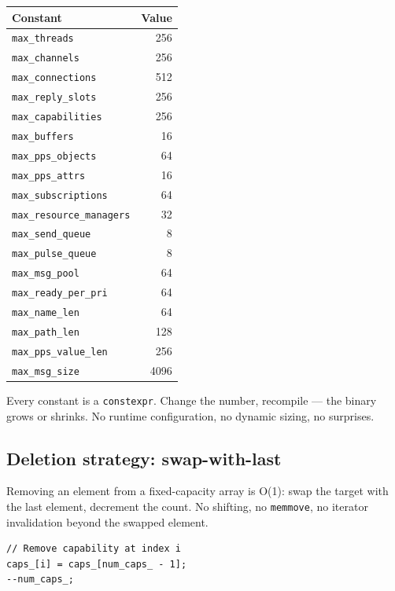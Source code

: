 \documentclass[11pt]{article}
\begin{document}
\begin{longtable}{lr}
\toprule
\textbf{Constant} & \textbf{Value} \\
\midrule
\texttt{max\_threads}          & 256 \\
\texttt{max\_channels}         & 256 \\
\texttt{max\_connections}      & 512 \\
\texttt{max\_reply\_slots}     & 256 \\
\texttt{max\_capabilities}     & 256 \\
\texttt{max\_buffers}          & 16  \\
\texttt{max\_pps\_objects}     & 64  \\
\texttt{max\_pps\_attrs}       & 16  \\
\texttt{max\_subscriptions}    & 64  \\
\texttt{max\_resource\_managers} & 32 \\
\texttt{max\_send\_queue}      & 8   \\
\texttt{max\_pulse\_queue}     & 8   \\
\texttt{max\_msg\_pool}        & 64  \\
\texttt{max\_ready\_per\_pri}  & 64  \\
\texttt{max\_name\_len}        & 64  \\
\texttt{max\_path\_len}        & 128 \\
\texttt{max\_pps\_value\_len}  & 256 \\
\texttt{max\_msg\_size}        & 4096 \\
\bottomrule
\end{longtable}

Every constant is a \texttt{constexpr}.  Change the number,
recompile --- the binary grows or shrinks.  No runtime
configuration, no dynamic sizing, no surprises.

\subsection{Deletion strategy: swap-with-last}

Removing an element from a fixed-capacity array is O(1):
swap the target with the last element, decrement the count.
No shifting, no \texttt{memmove}, no iterator invalidation
beyond the swapped element.

\begin{Verbatim}[fontsize=\small,frame=single]
// Remove capability at index i
caps_[i] = caps_[num_caps_ - 1];
--num_caps_;
\end{Verbatim}
\end{document}
